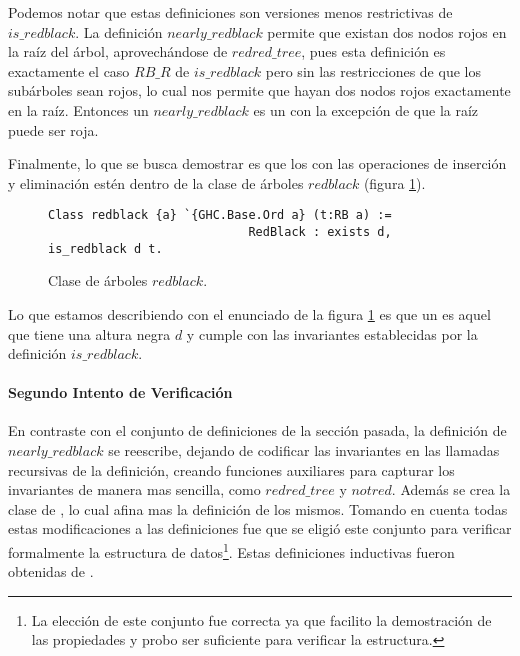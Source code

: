 Podemos notar que estas definiciones son versiones menos restrictivas de $is\_redblack$. La
definici\'on $nearly\_redblack$ permite que existan dos nodos rojos en la ra\'iz del \'arbol,
aprovech\'andose de $redred\_tree$, pues esta definici\'on es exactamente el caso $RB\_R$ de
$is\_redblack$ pero sin las restricciones de que los sub\'arboles sean rojos, lo cual nos permite
que hayan dos nodos rojos exactamente en la ra\'iz. Entonces un $nearly\_redblack$ es un {\arn} con
la excepci\'on de que la ra\'iz puede ser roja.

Finalmente, lo que se busca demostrar es que los {\arns} con las operaciones de inserci\'on y
eliminaci\'on est\'en dentro de la clase de \'arboles $redblack$ (figura \ref{class_rb}).

\begin{figure}[!ht]
\centering
\captionsetup{justification=centering}
\begin{verbatim}
Class redblack {a} `{GHC.Base.Ord a} (t:RB a) :=
                            RedBlack : exists d, is_redblack d t.
\end{verbatim}
\caption{Clase de \'arboles $redblack$.}
\label{class_rb}
\end{figure}

Lo que estamos describiendo con el enunciado de la figura \ref{class_rb} es que un {\arn} es aquel que tiene una altura
negra $d$ y cumple con las invariantes establecidas por la definici\'on $is\_redblack$.

\paragraph{Segundo Intento de Verificaci\'on}
En contraste con el conjunto de definiciones de la secci\'on pasada, la definici\'on de
$nearly\_redblack$ se reescribe, dejando de codificar las invariantes en las llamadas recursivas
de la definición, creando funciones auxiliares para capturar los invariantes de manera mas
sencilla, como $redred\_tree$ y $notred$. Además se crea la clase de {\arns}, lo cual afina mas la
definici\'on de los mismos. Tomando en cuenta todas estas modificaciones a las definiciones fue que
se eligió este conjunto para verificar formalmente la estructura de datos\footnote{La elecci\'on
de este conjunto fue correcta ya que facilito la demostraci\'on de las propiedades y probo ser
suficiente para verificar la estructura.}.
Estas definiciones inductivas fueron obtenidas de \cite{MSetRBT}.
